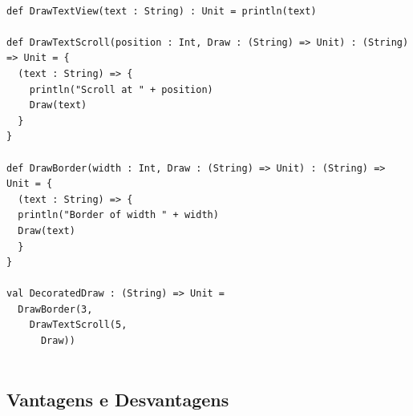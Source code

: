 \begin{lstlisting}[caption={Decorator Funcional},label=fpdecorator]
    
def DrawTextView(text : String) : Unit = println(text)

def DrawTextScroll(position : Int, Draw : (String) => Unit) : (String) => Unit = {
  (text : String) => {
    println("Scroll at " + position)
    Draw(text)
  }
}

def DrawBorder(width : Int, Draw : (String) => Unit) : (String) => Unit = {
  (text : String) => {
  println("Border of width " + width)
  Draw(text)
  }
}

val DecoratedDraw : (String) => Unit =
  DrawBorder(3,
    DrawTextScroll(5,
      Draw))
    
\end{lstlisting}

\subsection*{Vantagens e Desvantagens}